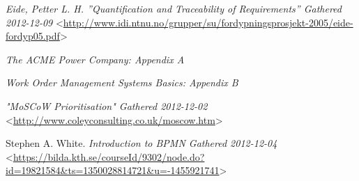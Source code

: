 \begin{thebibliography}{99}     
	

 \emph{Eide, Petter L. H. \textsl{''Quantification and Traceability of Requirements''} Gathered 2012-12-09 } <\url{http://www.idi.ntnu.no/grupper/su/fordypningsprosjekt-2005/eide-fordyp05.pdf}>


 \emph{The ACME Power Company: Appendix A}

 \emph{Work Order Management Systems Basics: Appendix B}


 \emph{\textsl{"MoSCoW Prioritisation"} Gathered 2012-12-02} <\url{http://www.coleyconsulting.co.uk/moscow.htm}>

 Stephen A. White. \textsl{Introduction to BPMN Gathered 2012-12-04} <\url{https://bilda.kth.se/courseId/9302/node.do?id=19821584&ts=1350028814721&u=-1455921741}> 

\end{thebibliography}